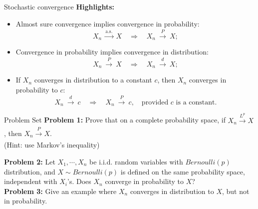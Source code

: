 \documentclass [aspectratio=169]{beamer}
\begin{document}
\begin{frame}{Stochastic convergence}
\textbf{Highlights:}
    \begin{itemize}
        \item Almost sure convergence implies convergence in probability:
        $${\displaystyle X_{n}\ {\xrightarrow {\text{a.s.}}}\ X\quad \Rightarrow \quad X_{n}\ {\xrightarrow {\overset {}{P}}}\ X};$$
        \item Convergence in probability implies convergence in distribution:
        $$
        {\displaystyle X_{n}\ {\xrightarrow {\overset {}{P}}}\ X\quad \Rightarrow \quad X_{n}\ {\xrightarrow {\overset {}{d}}}\ X};
        $$
        \item If $X_n$ converges in distribution to a constant $c$, then $X_n$ converges in probability to $c$:
$$
X_{n}\ {\xrightarrow {\overset {}{d}}}\ c\quad \Rightarrow \quad X_{n}\ {\xrightarrow {\overset {}{P}}}\ c, \quad \text{provided $c$ is a constant}.
$$
    \end{itemize}
\end{frame}



\begin{frame}{Problem Set}
    \textbf{Problem 1:}  Prove that on a complete probability space, if $X_n  \xrightarrow[]{L^p} X$, then $X_n \xrightarrow[]{P} X$. \\
    (Hint: use Markov's inequality)\\
    \vspace{0.1in}
    
     \textbf{Problem 2:} Let $X_1, \cdots, X_n$ be i.i.d. random variables with $Bernoulli(p)$ distribution, and  $X \sim Bernoulli(p)$ is defined on the same probability space, independent with $X_i$'s. Does $X_n$ converge in probability to $X$? 
    \vspace{0.1in}\\
    
    \textbf{Problem 3:} Give an example where $X_n$ converges in distribution to $X$, but not in probability.
    \vspace{0.1in}\\
\end{frame}
\end{document}
